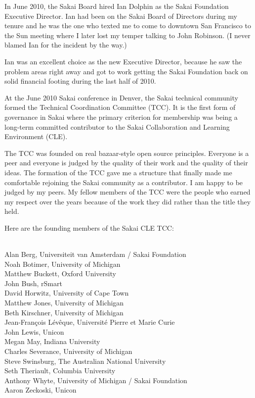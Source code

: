 \documentclass[12pt]{book}
\begin{document}
In June 2010, the Sakai Board hired Ian Dolphin as the Sakai Foundation
Executive Director.  Ian had been on the Sakai Board of Directors
during my tenure and
he was the one who texted me to come to downtown San Francisco to the
Sun meeting where I later lost my temper talking to John Robinson.  (I never
blamed Ian for the incident by the way.)

Ian was an excellent choice as the new Executive Director, because he saw the
problem areas right away and got to work getting the Sakai Foundation
back on solid financial footing during the last half of 2010.

At the June 2010 Sakai conference in Denver, the Sakai technical
community formed the Technical Coordination Committee (TCC).
It is the first form of governance in Sakai where the primary
criterion for membership was being a long-term committed
contributor to the Sakai Collaboration and Learning Environment
(CLE).

The TCC was founded on real bazaar-style open source principles.
Everyone is a peer and everyone is judged by the quality of their work
and the quality of their ideas.  The formation of the TCC gave me
a structure that finally made me comfortable rejoining the Sakai
community as a contributor.  I am happy to be judged by my peers.
My fellow members of the TCC were the people who earned my respect
over the years because of the work they did rather than the
title they held.

Here are the founding members of the Sakai CLE TCC:\\
\\
\begin{sf}
Alan Berg, Universiteit van Amsterdam / Sakai Foundation\\
Noah Botimer, University of Michigan\\
Matthew Buckett, Oxford University\\
John Bush, rSmart \\
David Horwitz, University of Cape Town\\
Matthew Jones, University of Michigan \\
Beth Kirschner, University of Michigan\\
Jean-Fran\c{c}ois L\'{e}v\^{e}que, Universit\'{e} Pierre et Marie Curie\\
John Lewis, Unicon\\
Megan May, Indiana University\\
Charles Severance, University of Michigan\\
Steve Swinsburg, The Australian National University\\
Seth Theriault, Columbia University\\
Anthony Whyte, University of Michigan / Sakai Foundation\\
Aaron Zeckoski, Unicon\\
\end{sf}
\end{document}
